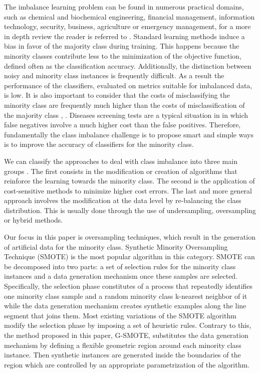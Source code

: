 \documentclass[parskip=full]{scrartcl}
\begin{document}
The imbalance learning problem can be found in numerous practical domains, such
as chemical and biochemical engineering, financial management, information
technology, security, business, agriculture or emergency management, for a more
in depth review the reader is referred to \cite{Haixiang2017}. Standard learning
methods induce a bias in favor of the majority class during training. This
happens because the minority classes contribute less to the minimization of the
objective function, defined often as the classification accuracy. Additionally,
the distinction between noisy and minority class instances is frequently
difficult. As a result the performance of the classifiers, evaluated on metrics
suitable for imbalanced data, is low. It is also important to consider that the
costs of misclassifying the minority class are frequently much higher than the
costs of misclassification of the majority class \cite{Domingos1999},
\cite{Ting2002}. Diseases screening tests are a typical situation in in which
false negatives involve a much higher cost than the false positives. Therefore,
fundamentally the class imbalance challenge is to propose smart and simple ways
is to improve the accuracy of classifiers for the minority class.

We can classify the approaches to deal with class imbalance into three main
groups \cite{Fernandez2013}. The first consists in the modification or creation
of algorithms that reinforce the learning towards the minority class. The second
is the application of cost-sensitive methods to minimize higher cost errors. The
last and more general approach involves the modification at the data level by
re-balancing the class distribution. This is usually done through the use of
undersampling, oversampling or hybrid methods.

Our focus in this paper is oversampling techniques, which result in the
generation of artificial data for the minority class. Synthetic Minority
Oversampling Technique (SMOTE) \cite{Chawla2002} is the most popular algorithm
in this category. SMOTE can be decomposed into two parts: a set of selection
rules for the minority class instances and a data generation mechanism once
these samples are selected. Specifically, the selection phase constitutes of a
process that repeatedly identifies one minority class sample and a random
minority class k-nearest neighbor of it while the data generation mechanism
creates synthetic examples along the line segment that joins them. Most existing
variations of the SMOTE algorithm modify the selection phase by imposing a set
of heuristic rules. Contrary to this, the method proposed in this paper,
G-SMOTE, substitutes the data generation mechanism by defining a flexible
geometric region around each minority class instance. Then synthetic instances
are generated inside the boundaries of the region which are controlled by an
appropriate parametrization of the algorithm.
\end{document}
